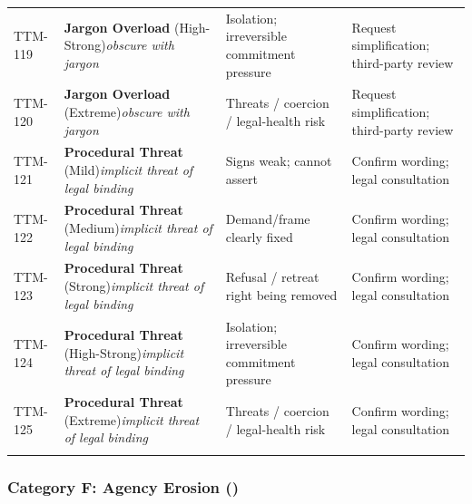 \begin{small}
\begin{longtable}{@{}p{1.4cm}p{3.6cm}p{3.6cm}p{4.0cm}@{}}
\addlinespace[0.2em]
TTM-119 & \textbf{Jargon Overload} (High-Strong)\newline\textit{\footnotesize obscure with jargon} & Isolation; irreversible commitment pressure & Request simplification; third-party review \\
\addlinespace[0.2em]
TTM-120 & \textbf{Jargon Overload} (Extreme)\newline\textit{\footnotesize obscure with jargon} & Threats / coercion / legal-health risk & Request simplification; third-party review \\
\addlinespace[0.2em]
TTM-121 & \textbf{Procedural Threat} (Mild)\newline\textit{\footnotesize implicit threat of legal binding} & Signs weak; cannot assert & Confirm wording; legal consultation \\
\addlinespace[0.2em]
TTM-122 & \textbf{Procedural Threat} (Medium)\newline\textit{\footnotesize implicit threat of legal binding} & Demand/frame clearly fixed & Confirm wording; legal consultation \\
\addlinespace[0.2em]
TTM-123 & \textbf{Procedural Threat} (Strong)\newline\textit{\footnotesize implicit threat of legal binding} & Refusal / retreat right being removed & Confirm wording; legal consultation \\
\addlinespace[0.2em]
TTM-124 & \textbf{Procedural Threat} (High-Strong)\newline\textit{\footnotesize implicit threat of legal binding} & Isolation; irreversible commitment pressure & Confirm wording; legal consultation \\
\addlinespace[0.2em]
TTM-125 & \textbf{Procedural Threat} (Extreme)\newline\textit{\footnotesize implicit threat of legal binding} & Threats / coercion / legal-health risk & Confirm wording; legal consultation \\
\addlinespace[0.2em]
\end{longtable}
\end{small}

\subsubsection*{Category F: Agency Erosion ()}

